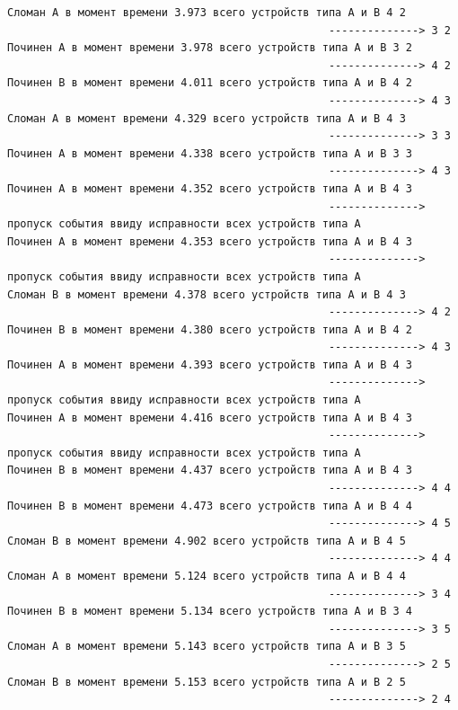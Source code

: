 \begin{verbatim}
Сломан A в момент времени 3.973 всего устройств типа А и В 4 2
                                                  --------------> 3 2
Починен A в момент времени 3.978 всего устройств типа А и В 3 2
                                                  --------------> 4 2
Починен B в момент времени 4.011 всего устройств типа А и В 4 2
                                                  --------------> 4 3
Сломан A в момент времени 4.329 всего устройств типа А и В 4 3
                                                  --------------> 3 3
Починен A в момент времени 4.338 всего устройств типа А и В 3 3
                                                  --------------> 4 3
Починен A в момент времени 4.352 всего устройств типа А и В 4 3
                                                  --------------> пропуск события ввиду исправности всех устройств типа А
Починен A в момент времени 4.353 всего устройств типа А и В 4 3
                                                  --------------> пропуск события ввиду исправности всех устройств типа А
Сломан B в момент времени 4.378 всего устройств типа А и В 4 3
                                                  --------------> 4 2
Починен B в момент времени 4.380 всего устройств типа А и В 4 2
                                                  --------------> 4 3
Починен A в момент времени 4.393 всего устройств типа А и В 4 3
                                                  --------------> пропуск события ввиду исправности всех устройств типа А
Починен A в момент времени 4.416 всего устройств типа А и В 4 3
                                                  --------------> пропуск события ввиду исправности всех устройств типа А
Починен B в момент времени 4.437 всего устройств типа А и В 4 3
                                                  --------------> 4 4
Починен B в момент времени 4.473 всего устройств типа А и В 4 4
                                                  --------------> 4 5
Сломан B в момент времени 4.902 всего устройств типа А и В 4 5
                                                  --------------> 4 4
Сломан A в момент времени 5.124 всего устройств типа А и В 4 4
                                                  --------------> 3 4
Починен B в момент времени 5.134 всего устройств типа А и В 3 4
                                                  --------------> 3 5
Сломан A в момент времени 5.143 всего устройств типа А и В 3 5
                                                  --------------> 2 5
Сломан B в момент времени 5.153 всего устройств типа А и В 2 5
                                                  --------------> 2 4

\end{verbatim}
